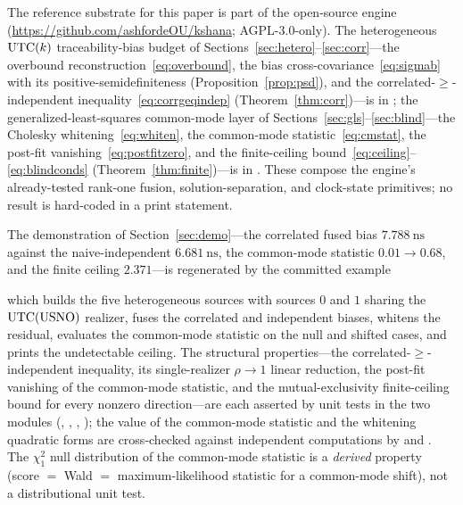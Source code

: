 \label{sec:availability}
The reference substrate for this paper is part of the open-source 
engine \citep{baweja2026kshana} (\url{https://github.com/ashfordeOU/kshana};
AGPL-3.0-only). The heterogeneous $\mathrm{UTC}(k){}$ traceability-bias budget of
Sections~\ref{sec:hetero}--\ref{sec:corr}---the overbound
reconstruction~\eqref{eq:overbound}, the bias cross-covariance~\eqref{eq:sigmab}
with its positive-semidefiniteness (Proposition~\ref{prop:psd}), and the
correlated-$\ge$-independent inequality~\eqref{eq:corrgeqindep}
(Theorem~\ref{thm:corr})---is in ; the
generalized-least-squares common-mode layer of Sections~\ref{sec:gls}--\ref{sec:blind}---the
Cholesky whitening~\eqref{eq:whiten}, the common-mode statistic~\eqref{eq:cmstat},
the post-fit vanishing~\eqref{eq:postfitzero}, and the finite-ceiling
bound~\eqref{eq:ceiling}--\eqref{eq:blindconds} (Theorem~\ref{thm:finite})---is in
. These compose the engine's already-tested
rank-one fusion, solution-separation, and clock-state primitives; no result is
hard-coded in a print statement.

The demonstration of Section~\ref{sec:demo}---the correlated fused bias
$\SI{7.788}{\nano\second}$ against the naive-independent $\SI{6.681}{\nano\second}$,
the common-mode statistic $0.01\to0.68$, and the finite ceiling $2.371$---is
regenerated by the committed example
\begin{quote}
\end{quote}
which builds the five heterogeneous sources with sources $0$ and $1$ sharing the
$\mathrm{UTC}{}(\mathrm{USNO})$ realizer, fuses the correlated and independent biases,
whitens the residual, evaluates the common-mode statistic on the null and shifted
cases, and prints the undetectable ceiling. The \Proven{} structural
properties---the correlated-$\ge$-independent inequality, its single-realizer
$\rho\!\to\!1$ linear reduction, the post-fit vanishing of the common-mode
statistic, and the mutual-exclusivity finite-ceiling bound for every nonzero
direction---are each asserted by unit tests in the two modules
(,
,
,
); the
value of the common-mode statistic and the whitening quadratic forms are
cross-checked against independent  computations by
 and .
The $\chi^2_1$ null distribution of the common-mode statistic is a \Proven{}
\emph{derived} property (score $=$ Wald $=$ maximum-likelihood statistic for a
common-mode shift), not a distributional unit test.


